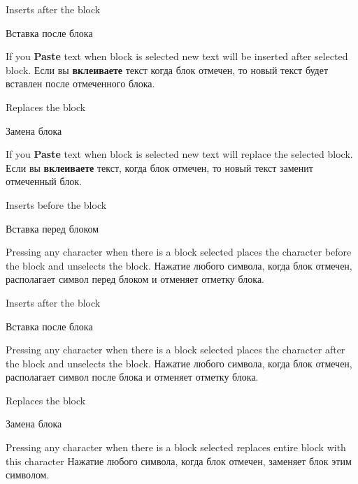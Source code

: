 \begin{popup}
\ifenglish
\caption{Inserts after the block}
\else
\caption{Вставка после блока}
\fi
{}

\ifenglish
If you {\bf Paste} text when block is selected new text will be inserted after
selected block.
\else
Если вы {\bf вклеиваете} текст когда блок отмечен, то новый текст будет вставлен
после отмеченного блока.
\fi

\end{popup}

\begin{popup}

\ifenglish
\caption{Replaces the block}
\else
\caption{Замена блока}
\fi
{}
\ifenglish
If you {\bf Paste} text when block is selected new text will replace the
selected block.
\else
Если вы {\bf вклеиваете} текст, когда блок отмечен, то новый текст заменит
отмеченный блок.
\fi
\end{popup}

\begin{popup}
\ifenglish
\caption{Inserts before the block}
\else
\caption{Вставка перед блоком}
\fi
{}
\ifenglish
Pressing any character when there is a block selected places the character
before the block and unselects the block.
\else
Нажатие любого символа, когда блок отмечен, располагает символ перед блоком
и отменяет отметку блока.
\fi
\end{popup}

\begin{popup}
\ifenglish
\caption{Inserts after the block}
\else
\caption{Вставка после блока}
\fi
{}
\ifenglish
Pressing any character when there is a block selected places the character
after the block and unselects the block.
\else
Нажатие любого символа, когда блок отмечен, располагает символ после блока
и отменяет отметку блока.
\fi
\end{popup}

\begin{popup}
\ifenglish
\caption{Replaces the block}
\else
\caption{Замена блока}
\fi
{}
\ifenglish
Pressing any character when there is a block selected
replaces entire block with this character
\else
Нажатие любого символа, когда блок отмечен, заменяет блок
этим символом.
\fi
\end{popup}


